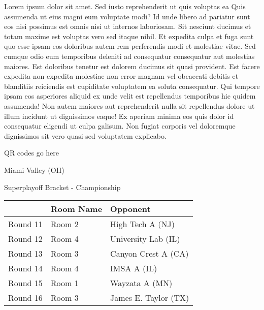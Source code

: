 \documentclass{article}%
\begin{document}
\vspace*{8pt}%
\linebreak%
\newline%
\newline%
    Lorem ipsum dolor sit amet. Sed iusto reprehenderit ut quis voluptas ea Quis assumenda ut eius magni eum voluptate modi? Id unde libero ad pariatur sunt eos nisi possimus est omnis nisi ut internos laboriosam. Sit nesciunt ducimus et totam maxime est voluptas vero sed itaque nihil. Et expedita culpa et fuga sunt quo esse ipsam eos doloribus autem rem perferendis modi et molestiae vitae.\newline%
\newline%
    Sed cumque odio eum temporibus deleniti ad consequatur consequatur aut molestias maiores. Est doloribus tenetur est dolorem ducimus sit quasi provident. Est facere expedita non expedita molestiae non error magnam vel obcaecati debitis et blanditiis reiciendis est cupiditate voluptatem ea soluta consequatur. Qui tempore ipsam eos asperiores aliquid ex unde velit est repellendus temporibus hic quidem assumenda!\newline%
\newline%
    Non autem maiores aut reprehenderit nulla sit repellendus dolore ut illum incidunt ut dignissimos eaque! Ex aperiam minima eos quis dolor id consequatur eligendi ut culpa galisum. Non fugiat corporis vel doloremque dignissimos sit vero quasi sed voluptatem explicabo.\newline%
\newline%
\vspace*{30pt}%
\begin{center}%
\begin{Huge}%
QR codes go here%
\end{Huge}%
\end{center}%
\newpage%
\begin{center}%
\begin{Huge}%
Miami Valley (OH)%
\end{Huge}%
\vspace*{8pt}%
\linebreak%
\begin{Large}%
Superplayoff Bracket {-} Championship%
\end{Large}%
\end{center}%
%
\begin{tabularx}{\textwidth}{|c|Y|Y|}%
\hline%
&Room Name&Opponent\\%
\hline%
Round 11&Room 2&High Tech A (NJ)\\%
Round 12&Room 4&University Lab (IL)\\%
Round 13&Room 3&Canyon Crest A (CA)\\%
Round 14&Room 4&IMSA A (IL)\\%
Round 15&Room 1&Wayzata A (MN)\\%
Round 16&Room 3&James E. Taylor (TX)\\%
\hline%
\end{tabularx}%
\end{document}
